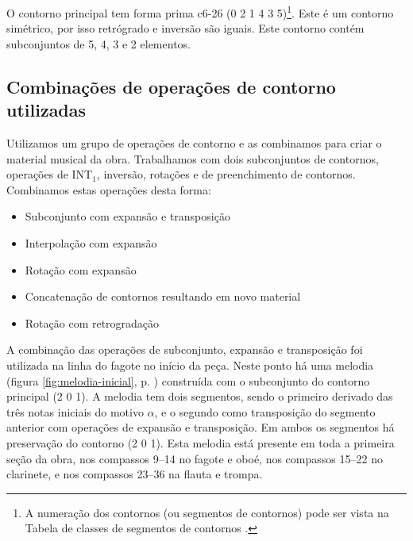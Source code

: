O contorno principal \contpr{} tem forma prima c6-26 (0 2 1 4 3
5)\footnote{A numeração dos contornos (ou segmentos de contornos) pode
  ser vista na Tabela de classes de segmentos de contornos
  \cite{marvin.ea87:relating}.}. Este é um contorno simétrico, por
isso retrógrado e inversão são iguais. Este contorno contém
subconjuntos de 5, 4, 3 e 2 elementos.

\subsection{Combinações de operações de contorno utilizadas}
\label{sec:comb-de-oper}

Utilizamos um grupo de operações de contorno e as combinamos para
criar o material musical da obra. Trabalhamos com dois subconjuntos de
contornos, operações de INT$_1$, inversão, rotações e de preenchimento
de contornos. Combinamos estas operações desta forma:

\begin{itemize}
\item Subconjunto com expansão e transposição
\item Interpolação com expansão
\item Rotação com expansão
\item Concatenação de contornos resultando em novo material
\item Rotação com retrogradação
\end{itemize}




A combinação das operações de subconjunto, expansão e transposição foi
utilizada na linha do fagote no início da peça. Neste ponto há uma
melodia (figura \ref{fig:melodia-inicial},
p. \pageref{fig:melodia-inicial}) construída com o subconjunto do
contorno principal (2 0 1). A melodia tem dois segmentos, sendo o
primeiro derivado das três notas iniciais do motivo $\alpha$, e o
segundo como transposição do segmento anterior com operações de
expansão e transposição. Em ambos os segmentos há preservação do
contorno (2 0 1). Esta melodia está presente em toda a primeira seção
da obra, nos compassos 9--14 no fagote e oboé, nos compassos 15--22 no
clarinete, e nos compassos 23--36 na flauta e trompa.

